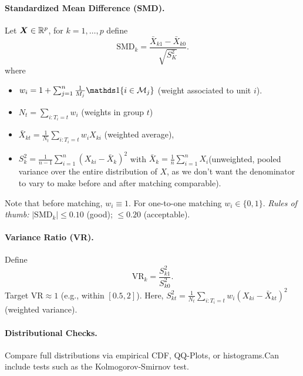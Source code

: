 \documentclass[11pt]{exam}
\begin{document}
\paragraph{Standardized Mean Difference (SMD).}
Let  $\bm{X} \in \mathbb{R}^p$, for $k = 1, \ldots, p$ define
\[
\mathrm{SMD}_k
= \frac{\bar X_{k1}-\bar X_{k0}}{\sqrt{S_K^2}}.
\]
where
\begin{itemize}
    \item $w_i = 1 + \sum_{j=1}^n \frac{1}{M_j}\indicator{i \in \mathcal{M}_j}$ (weight associated to unit $i$).
    \item $N_t = \sum_{i:T_i = t} w_i$ (weights in group $t$)
    \item $\bar X_{kt} = \frac{1}{N_t} \sum_{i: T_i = t} w_i X_{ki}$  (weighted average),  
    \item $S_{k}^2 =  \frac{1}{n-1} \sum_{i = 1}^n (X_{ki} - \bar X_{k})^2$ with $\bar X_k = \frac{1}{n} \sum_{i=1}^n X_i$(unweighted, pooled variance over the entire distribution of $X$, as we don't want the denominator to vary to make before and after matching comparable). 
\end{itemize}
Note that before matching, $w_i \equiv 1$. For one-to-one matching $w_i \in \{0, 1\}$.
\emph{Rules of thumb:} $|\mathrm{SMD}_k|\le 0.10$ (good); $\le 0.20$ (acceptable).


\paragraph{Variance Ratio (VR).}
Define
\[
\mathrm{VR}_k=\frac{S_{k1}^2}{S_{k0}^2}.
\]
Target $\mathrm{VR}\approx 1$ (e.g., within $[0.5,2]$). Here, $S_{kt}^2 =  \frac{1}{N_t} \sum_{i: T_i = t} w_i (X_{ki} - \bar X_{kt})^2 $ (weighted variance).

\paragraph{Distributional Checks.}
Compare full distributions via empirical CDF, QQ-Plots, or histograms.Can include tests such as the Kolmogorov-Smirnov test.
\end{document}
